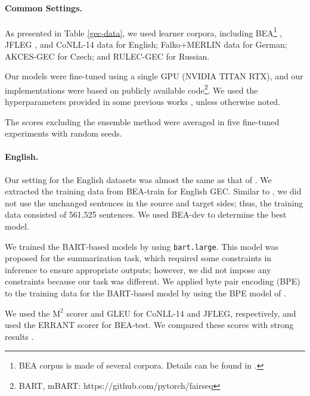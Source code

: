 \documentclass[11pt,a4paper]{article}
\begin{document}
\paragraph{Common Settings.}
As presented in Table \ref{gec-data}, we used learner corpora, including
BEA\footnote{BEA corpus is made of several corpora. Details can be found in \citet{bea2019}.} \cite{bea2019,locness,lang8-1,lang8-2,fce,nucle}, JFLEG \cite{jfleg}, and CoNLL-14 \cite{ng2014} data for English; Falko+MERLIN data \cite{merlin} for German; AKCES-GEC \cite{low_resource_gec} for Czech; and RULEC-GEC \cite{rulec} for Russian.

Our models were fine-tuned using a single GPU (NVIDIA TITAN RTX), and
 our implementations were based on publicly available code\footnote{BART, mBART: https://github.com/pytorch/fairseq}.
 We used the hyperparameters provided in some previous works \cite{bart,m-bart}, unless otherwise noted.

The scores excluding the ensemble method were averaged in five fine-tuned experiments with random seeds.

\paragraph{English.}
Our setting for the English datasets was almost the same as that of \citet{kiyono2019}.
We extracted the training data from BEA-train for English GEC.
Similar to \citet{kiyono2019}, we did not use the unchanged sentences in the source and target sides; thus, the training data consisted of 561,525 sentences.
We used BEA-dev to determine the best model.

We trained the BART-based models by using \verb|bart.large|.
This model was proposed for the summarization task, which required some constraints in inference to ensure appropriate outputs;
 however, we did not impose any constraints because our task was different.
We applied byte pair encoding (BPE) \cite{bpe} to the training data for the BART-based model by using the BPE model of \citet{bart}.

We used the $\mathrm{M^2}$ scorer \cite{m2score} and GLEU \cite{gleu} for CoNLL-14 and JFLEG, respectively, and
used the ERRANT scorer \cite{errant} for BEA-test.
We compared these scores with strong results \cite{kiyono2019,kaneko_bert}.
\end{document}
